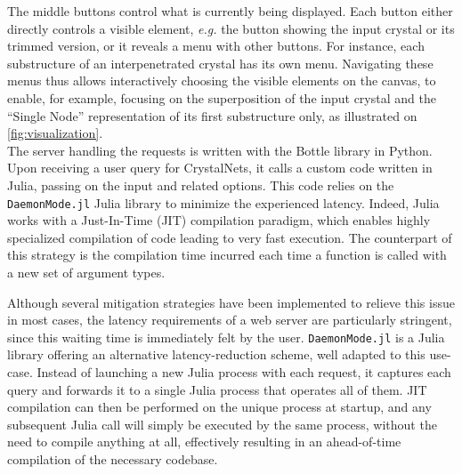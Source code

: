 \documentclass[main.tex]{subfiles}
\begin{document}
The middle buttons control what is currently being displayed. Each button either directly controls a visible element, \textit{e.g.} the button showing the input crystal or its trimmed version, or it reveals a menu with other buttons. For instance, each substructure of an interpenetrated crystal has its own menu. Navigating these menus thus allows interactively choosing the visible elements on the canvas, to enable, for example, focusing on the superposition of the input crystal and the ``Single Node'' representation of its first substructure only, as illustrated on \cref{fig:visualization}.\\


The server handling the requests is written with the Bottle library in Python. Upon receiving a user query for CrystalNets, it calls a custom code written in Julia, passing on the input and related options.
This code relies on the \texttt{DaemonMode.jl} Julia library to minimize the experienced latency. Indeed, Julia works with a Just-In-Time (JIT) compilation paradigm, which enables highly specialized compilation of code leading to very fast execution\autocite{JuliaDesign}. The counterpart of this strategy is the compilation time incurred each time a function is called with a new set of argument types. %

Although several mitigation strategies have been implemented to relieve this issue in most cases, the latency requirements of a web server are particularly stringent, since this waiting time is immediately felt by the user. \texttt{DaemonMode.jl} is a Julia library offering an alternative latency-reduction scheme, well adapted to this use-case. Instead of launching a new Julia process with each request, it captures each query and forwards it to a single Julia process that operates all of them. JIT compilation can then be performed on the unique process at startup, and any subsequent Julia call will simply be executed by the same process, without the need to compile anything at all, effectively resulting in an ahead-of-time compilation of the necessary codebase.
\end{document}
